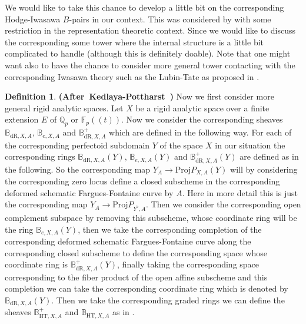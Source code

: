 \documentclass[12pt]{amsart}
\theoremstyle{definition}
\newtheorem{definition}[theorem]{Definition}
\numberwithin{equation}{section}
\begin{document}
We would like to take this chance to develop a little bit on the corresponding Hodge-Iwasawa $B$-pairs in our context. This was considered by \cite{KP} with some restriction in the representation theoretic context. Since we would like to discuss the corresponding some tower where the internal structure is a little bit complicated to handle (although this is definitely doable). Note that one might want also to have the chance to consider more general tower contacting with the corresponding Iwasawa theory such as the Lubin-Tate as proposed in \cite{KP}.




\begin{definition} \mbox{\bf{(After Kedlaya-Pottharst \cite[Definition 2.17]{KP})}}
Now we first consider more general rigid analytic spaces. Let $X$ be a rigid analytic space over a finite extension $E$ of $\mathbb{Q}_p$ or $\mathbb{F}_p((t))$. Now we consider the corresponding sheaves $\mathbb{B}_{\mathrm{dR},X,A}$, $\mathbb{B}_{e,X,A}$ and $\mathbb{B}^+_{\mathrm{dR},X,A}$ which are defined in the following way. For each of the corresponding perfectoid subdomain $Y$ of the space $X$ in our situation the corresponding rings $\mathbb{B}_{\mathrm{dR},X,A}(Y)$, $\mathbb{B}_{e,X,A}(Y)$ and $\mathbb{B}^+_{\mathrm{dR},X,A}(Y)$ are defined as in the following. So the corresponding map $Y_A \rightarrow \mathrm{Proj} P_{X,A}(Y)$ will by considering the corresponding zero locus define a closed subscheme in the corresponding deformed schematic Fargues-Fontaine curve by $A$. Here in more detail this is just the corresponding map $Y_A \rightarrow \mathrm{Proj} P_{Y^\flat,A}$.
Then we consider the corresponding open complement subspace by removing this subscheme, whose coordinate ring will be the ring $\mathbb{B}_{e,X,A}(Y)$, then we take the corresponding completion of the corresponding deformed schematic Fargues-Fontaine curve along the corresponding closed subscheme to define the corresponding space whose coordinate ring is $\mathbb{B}^+_{\mathrm{dR},X,A}(Y)$, finally taking the corresponding space corresponding to the fiber product of the open affine subscheme and this completion we can take the corresponding coordinate ring which is denoted by $\mathbb{B}_{\mathrm{dR},X,A}(Y)$. Then we take the corresponding graded rings we can define the sheaves $\mathbb{B}^+_{\mathrm{HT},X,A}$ and $\mathbb{B}_{\mathrm{HT},X,A}$ as in \cite[Definition 8.6.5]{KL16}. 
\end{definition}
\end{document}
